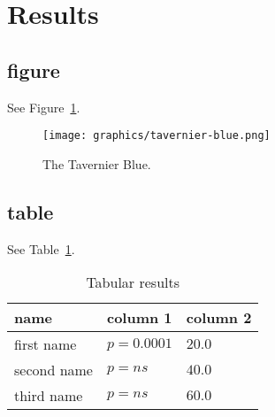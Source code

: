 % 

\section{Results}


\subsection{figure}

See Figure~\ref{fig:tavernier-blue}.

\begin{figure}[!ht]
    \centering
    {\texttt{[image: graphics/tavernier-blue.png]}}
    \caption{The Tavernier Blue.}
    \label{fig:tavernier-blue}
\end{figure}

\subsection{table}

See Table~\ref{fig:tabular-results}.

\begin{table}[htp]
\caption{Tabular results}
\label{fig:tabular-results}
\begin{tabular}{p{1.25in}p{1.25in}p{1.25in}}
\toprule
name & column 1 & column 2 \\
\midrule
first name & $p=0.0001$ & $20.0$ \\
second name & $p=ns$ & $40.0$ \\
third name & $p=ns$ & $60.0$
\end{tabular}
\end{table}
